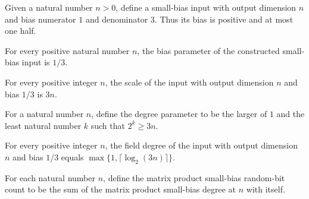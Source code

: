 \begin{definition}
\label{FABL.matrixProductOneThirdSmallBiasInput}
\leanok
{}
Given a natural number $n>0$, define a small-bias input with output dimension $n$ and
bias numerator $1$ and denominator $3$. Thus its bias is positive and at most one half.
\end{definition}

\begin{theorem}
\label{FABL.matrixProductOneThirdSmallBiasInput_epsilon}
\leanok
{}
For every positive natural number $n$, the bias parameter of the constructed small-bias
input is $1/3$.
\end{theorem}

\begin{theorem}
\label{FABL.matrixProductOneThirdSmallBiasInput_scale}
\leanok
{}
For every positive integer $n$, the scale of the input with output dimension $n$ and
bias $1/3$ is $3n$.
\end{theorem}

\begin{definition}
\label{FABL.matrixProductSmallBiasDegree}
\leanok
For a natural number $n$, define the degree parameter to be the larger of $1$ and the
least natural number $k$ such that $2^k\ge 3n$.
\end{definition}

\begin{theorem}
\label{FABL.matrixProductOneThirdSmallBiasInput_fieldDegree}
\leanok
{}
For every positive integer $n$, the field degree of the input with output dimension $n$
and bias $1/3$ equals $\max\{1,\lceil\log_2(3n)\rceil\}$.
\end{theorem}

\begin{definition}
\label{FABL.matrixProductSmallBiasRandomBits}
\leanok
{}
For each natural number $n$, define the matrix product small-bias random-bit count to be
the sum of the matrix product small-bias degree at $n$ with itself.
\end{definition}

